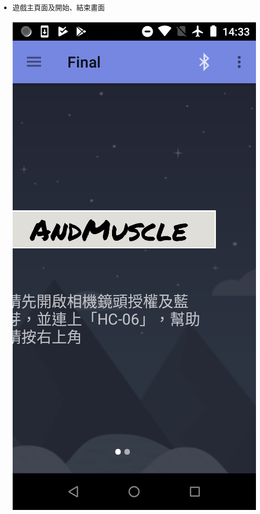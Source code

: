 \documentclass[a0paper,portrait]{baposter}
\begin{document}
\begin{poster}
{\begin{itemize}
\item 遊戲主頁面及開始、結束畫面 \\ \\
\includegraphics[scale=0.17]{game01.png} 
\space \space

\end{itemize}}
\end{poster}
\end{document}
